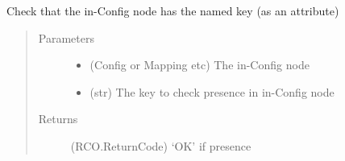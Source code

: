 \documentclass[a4paper,10pt,english]{sphinxmanual}
\begin{document}
\begin{fulllineitems}
\label{\detokenize{apidoc_src/src:src.utilsSat.check_has_key}}
Check that the in-Config node has the named key (as an attribute)
\begin{quote}\begin{description}
\item[{Parameters}] \leavevmode\begin{itemize}
\item {} 
 \textendash{} (Config or Mapping etc) The in-Config node

\item {} 
 \textendash{} (str) The key to check presence in in-Config node

\end{itemize}

\item[{Returns}] \leavevmode
(RCO.ReturnCode) ‘OK’ if presence

\end{description}\end{quote}

\end{fulllineitems}


\begin{fulllineitems}
\label{\detokenize{apidoc_src/src:src.utilsSat.critical}}
\end{fulllineitems}


\begin{fulllineitems}
\label{\detokenize{apidoc_src/src:src.utilsSat.cyan}}
\end{fulllineitems}

\end{document}
